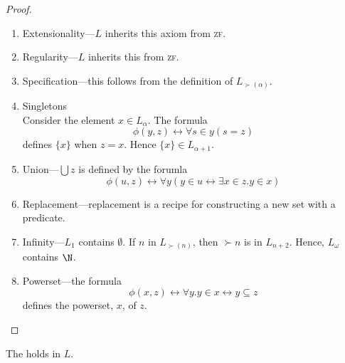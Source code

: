 \documentclass{scrbook}
\renewcommand{\iff}{\leftrightarrow}
\begin{document}
\begin{proof}
  \begin{enumerate}
  \item Extensionality---$L$ inherits this axiom from \textsc{zf}.
  \item Regularity---$L$ inherits this from \textsc{zf}. 
  \item Specification---this follows from the definition of $L_{\succ(\alpha)}$. 
  \item Singletons \\
    Consider the element $x\in L_\alpha$. The formula 
    \[
    \phi(y,z) \iff \forall s\in y (s=z)
    \]
    defines $\{x\}$ when $z=x$. Hence $\{x\}\in L_{\alpha+1}$. 
  \item Union---$\bigcup z$ is defined by the forumla
    \[
    \phi(u,z)\iff \forall y ( y\in u \iff \exists x \in z . y\in x)
    \]
  \item Replacement---replacement is a recipe for constructing a new set with a predicate. 
  \item Infinity---$L_1$ contains $\emptyset$. If $n$ in $L_{\succ (n)}$, then $\succ{n}$ is in $L_{n+2}$. Hence, $L_\omega$ contains $\N$. 
  \item Powerset---the formula
    \[
    \phi(x,z)\iff\forall y . y\in x \iff y\subseteq z
    \]
    defines the powerset, $x$, of $z$. 
  \end{enumerate}
\end{proof}
\begin{theorem}
  The  holds in $L$. 
\end{theorem}
\end{document}
